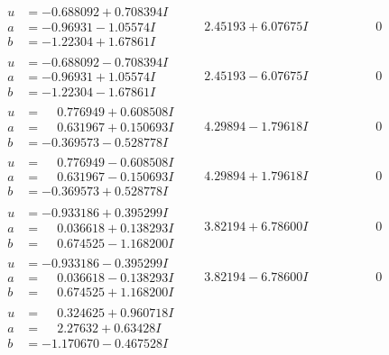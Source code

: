 \documentclass[1p]{elsarticle_modified}
\theoremstyle{definition}
\begin{document}
$$\begin{array}{c|c|c}
\begin{aligned}
u &= -0.688092 + 0.708394 I \\
a &= -0.96931 - 1.05574 I \\
b &= -1.22304 + 1.67861 I\end{aligned}
 & \phantom{-}2.45193 + 6.07675 I & \phantom{-0.000000 } 0 \\ \hline\begin{aligned}
u &= -0.688092 - 0.708394 I \\
a &= -0.96931 + 1.05574 I \\
b &= -1.22304 - 1.67861 I\end{aligned}
 & \phantom{-}2.45193 - 6.07675 I & \phantom{-0.000000 } 0 \\ \hline\begin{aligned}
u &= \phantom{-}0.776949 + 0.608508 I \\
a &= \phantom{-}0.631967 + 0.150693 I \\
b &= -0.369573 - 0.528778 I\end{aligned}
 & \phantom{-}4.29894 - 1.79618 I & \phantom{-0.000000 } 0 \\ \hline\begin{aligned}
u &= \phantom{-}0.776949 - 0.608508 I \\
a &= \phantom{-}0.631967 - 0.150693 I \\
b &= -0.369573 + 0.528778 I\end{aligned}
 & \phantom{-}4.29894 + 1.79618 I & \phantom{-0.000000 } 0 \\ \hline\begin{aligned}
u &= -0.933186 + 0.395299 I \\
a &= \phantom{-}0.036618 + 0.138293 I \\
b &= \phantom{-}0.674525 - 1.168200 I\end{aligned}
 & \phantom{-}3.82194 + 6.78600 I & \phantom{-0.000000 } 0 \\ \hline\begin{aligned}
u &= -0.933186 - 0.395299 I \\
a &= \phantom{-}0.036618 - 0.138293 I \\
b &= \phantom{-}0.674525 + 1.168200 I\end{aligned}
 & \phantom{-}3.82194 - 6.78600 I & \phantom{-0.000000 } 0 \\ \hline\begin{aligned}
u &= \phantom{-}0.324625 + 0.960718 I \\
a &= \phantom{-}2.27632 + 0.63428 I \\
b &= -1.170670 - 0.467528 I\end{aligned}

\end{array}$$
\end{document}
